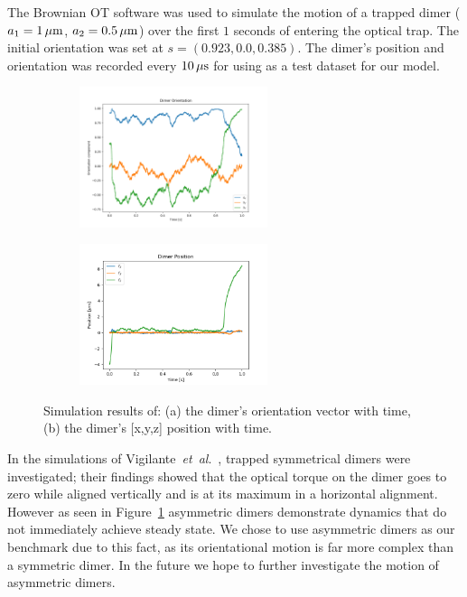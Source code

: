 \documentclass[12pt]{spieman}
\begin{document}
\begin{spacing}{1.5}
The Brownian OT software was used to simulate the motion of a trapped dimer ($a_1=1\,\mu{\rm m}$, $a_2=0.5\,\mu{\rm m}$) over the first $1$ seconds of entering the optical trap.  The initial orientation was set at $s = (0.923, 0.0, 0.385)$. The dimer's position and orientation was recorded every $10\,{\rm \mu s}$ for using as a test dataset for our model.

\begin{figure}[h]
	\centering
	\begin{subfigure}{0.45\textwidth}
		\subcaption{}
		\includegraphics[width =5.5cm]{./Images/fig7a.png}
	\end{subfigure}
	\begin{subfigure}{0.45\textwidth}
		\subcaption{}
		\includegraphics[width=5.5cm]{./Images/fig7b.png}
	\end{subfigure}
	\caption{Simulation results of: (a) the dimer's orientation vector with time, (b) the dimer's [x,y,z] position with time.}
	\label{fig:motion}
\end{figure}

In the simulations of Vigilante~\emph{et~al}.\ \cite{Vigilante2020Brownian_OT}, trapped symmetrical dimers were investigated; their findings showed that the optical torque on the dimer goes to zero while aligned vertically and is at its maximum in a horizontal alignment. However as seen in Figure~\ref{fig:motion} asymmetric dimers demonstrate dynamics that do not immediately achieve steady state. We chose to use asymmetric dimers as our benchmark due to this fact, as its orientational motion is far more complex than a symmetric dimer. In the future we hope to further investigate the motion of asymmetric dimers. 

\end{spacing}
\end{document}
